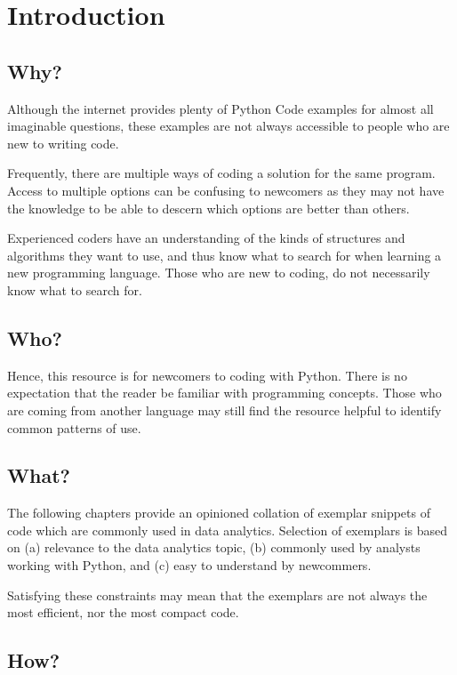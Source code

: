 \chapter{Introduction}
\label{chapter:introduction}

\section{Why?}

Although the internet provides plenty of Python Code examples for almost all imaginable questions, these examples are not always accessible to people who are new to writing code.

Frequently, there are multiple ways of coding a solution for the same program. Access to multiple options can be confusing to newcomers as they may not have the knowledge to be able to descern which options are better than others.

Experienced coders have an understanding of the kinds of structures and algorithms they want to use, and thus know what to search for when learning a new programming language. Those who are new to coding, do not necessarily know what to search for.

\section{Who?}

Hence, this resource is for newcomers to coding with Python. There is no expectation that the reader be familiar with programming concepts. Those who are coming from another language may still find the resource helpful to identify common patterns of use.

\section{What?}

The following chapters provide an opinioned collation of exemplar snippets of code which are commonly used in data analytics. Selection of exemplars is based on (a) relevance to the data analytics topic, (b) commonly used by analysts working with Python, and (c) easy to understand by newcommers.

Satisfying these constraints may mean that the exemplars are not always the most efficient, nor the most compact code.

\section{How?}

